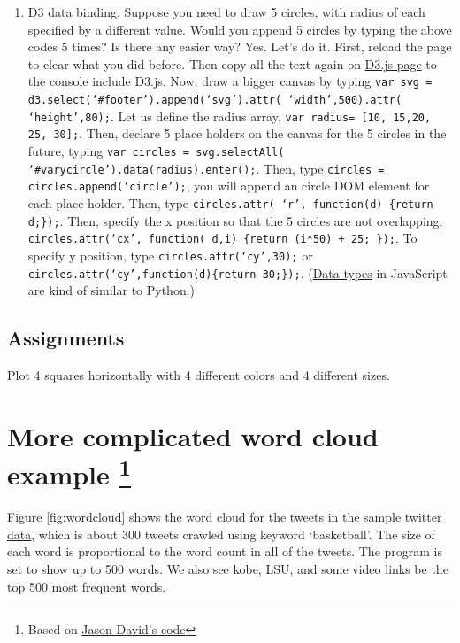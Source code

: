 \documentclass[a4paper, 11pt]{article}
\begin{document}
\begin{enumerate}
\item D3 data binding. Suppose you need to draw 5 circles, with radius of each specified by a different value. Would you append 5 circles by typing the above codes 5 times? Is there any easier way? Yes. Let's do it. First, reload the page to clear what you did before. Then copy all the text again on \href{https://raw.githubusercontent.com/mbostock/d3/master/d3.min.js}{D3.js page} to the console include D3.js. Now, draw a bigger canvas by typing \texttt{\color{red}var svg = d3.select(`\#{footer}').append(`svg').attr( `width',500).attr( `height',80);}. Let us define the radius array, \texttt{\color{red}var radius= [10, 15,20, 25, 30];}. Then, declare 5 place holders on the canvas for the 5 circles in the future, typing \texttt{\color{red}var circles = svg.selectAll( `\#{varycircle}').data(radius).enter();}. Then, type \texttt{\color{red}circles = circles.append(`circle');}, you will append an circle DOM element for each place holder. Then, type \texttt{\color{red}circles.attr( `r', function(d) \{return d;\});}. Then, specify the x position so that the 5 circles are not overlapping, \texttt{\color{red}circles.attr(`cx', function( d,i) \{return (i*50) + 25; \});}. To specify y position, type \texttt{\color{red}circles.attr(`cy',30);} or    
\texttt{\color{red}circles.attr(`cy',function(d)\{return 30;\});}. (\href{http://alignedleft.com/tutorials/d3/data-types}{Data types} in JavaScript are kind of similar to Python.)
\end{enumerate}

\subsection{Assignments}
Plot 4 squares horizontally with 4 different colors and 4 different sizes.

\section{More complicated word cloud example \protect \footnote{Based on \href{http://www.jasondavies.com/wordcloud}{Jason David's code}}}

Figure \ref{fig:wordcloud} shows the word cloud for the tweets in the sample \href{http://nymph332088.github.io/CIS4340/labassignments/Lab2/twitter_data.txt}{twitter data}, which is about 300 tweets crawled using keyword `basketball'. The size of each word is proportional to the word count in all of the tweets. The program is set to show up to 500 words. We also see kobe, LSU, and some video links be the top 500 most frequent words. 
\end{document}
